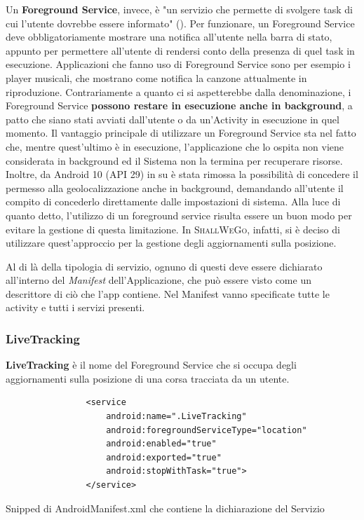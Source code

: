                 Un \textbf{Foreground Service}, invece, è "un servizio che permette di svolgere task di cui l'utente dovrebbe essere informato" (\cite{AndroidDocForeground}). Per funzionare, un Foreground Service deve obbligatoriamente mostrare una notifica all'utente nella barra di stato, appunto per permettere all'utente di rendersi conto della presenza di quel task in esecuzione. Applicazioni che fanno uso di Foreground Service sono per esempio i player musicali, che mostrano come notifica la canzone attualmente in riproduzione. Contrariamente a quanto ci si aspetterebbe dalla denominazione, i Foreground Service \textbf{possono restare in esecuzione anche in background}, a patto che siano stati avviati dall'utente o da un'Activity in esecuzione in quel momento. Il vantaggio principale di utilizzare un Foreground Service sta nel fatto che, mentre quest'ultimo è in esecuzione, l'applicazione che lo ospita non viene considerata in background ed il Sistema non la termina per recuperare risorse. Inoltre, da Android 10 (API 29) in su è stata rimossa la possibilità di concedere il permesso alla geolocalizzazione anche in background, demandando all'utente il compito di concederlo direttamente dalle impostazioni di sistema. Alla luce di quanto detto, l'utilizzo di un foreground service risulta essere un buon modo per evitare la gestione di questa limitazione. In \textsc{ShallWeGo}, infatti, si è deciso di utilizzare quest'approccio per la gestione degli aggiornamenti sulla posizione.

                Al di là della tipologia di servizio, ognuno di questi deve essere dichiarato all'interno del \textit{Manifest} dell'Applicazione, che può essere visto come un descrittore di ciò che l'app contiene. Nel Manifest vanno specificate tutte le activity e tutti i servizi presenti.
                \newpage
                \subsubsection{LiveTracking}
                    \textbf{LiveTracking} è il nome del Foreground Service che si occupa degli aggiornamenti sulla posizione di una corsa tracciata da un utente.

                    \begin{center}
                        \begin{code}
                            \begin{verbatim}
                <service
                    android:name=".LiveTracking"
                    android:foregroundServiceType="location"
                    android:enabled="true"
                    android:exported="true"
                    android:stopWithTask="true">
                </service>
                            \end{verbatim}
                            \caption{Snipped di AndroidManifest.xml che contiene la dichiarazione del Servizio}
                        \end{code}
                    \end{center}
    
